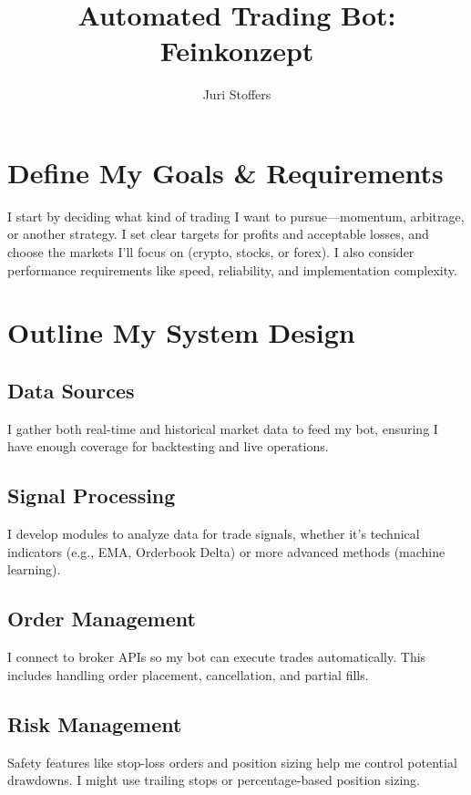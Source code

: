 \documentclass[9pt,a4paper,twocolumn,twoside]{tau-class/tau}
\title{Automated Trading Bot: Feinkonzept}
\author[a,1]{Juri Stoffers}
\affil[a]{Gymthun}
\begin{document}
\maketitle
\thispagestyle{firststyle}


\section{Define My Goals \& Requirements}

\taustart{} I start by deciding what kind of trading I want to pursue—momentum, 
arbitrage, or another strategy. I set clear targets for profits and acceptable 
losses, and choose the markets I'll focus on (crypto, stocks, or forex). 
I also consider performance requirements like speed, reliability, and 
implementation complexity.

\section{Outline My System Design}

\subsection{Data Sources}
I gather both real-time and historical market data to feed my bot, ensuring 
I have enough coverage for backtesting and live operations.



\subsection{Signal Processing}
I develop modules to analyze data for trade signals, whether it's technical 
indicators (e.g., EMA, Orderbook Delta) or more advanced methods (machine learning). 





\subsection{Order Management}
I connect to broker APIs so my bot can execute trades automatically. This 
includes handling order placement, cancellation, and partial fills.

\subsection{Risk Management}
Safety features like stop-loss orders and position sizing help me control 
potential drawdowns. I might use trailing stops or percentage-based 
position sizing.
\end{document}
